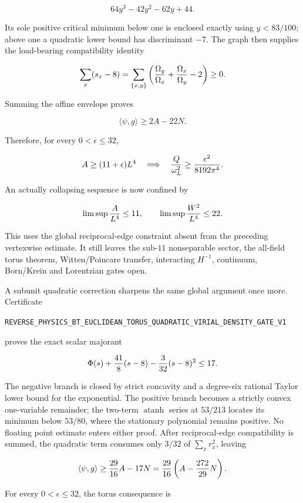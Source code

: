 \documentclass[11pt]{article}
\theoremstyle{definition}
\theoremstyle{remark}
\newcommand{\cert}[1]{\nolinkurl{#1}}
\begin{document}
\[
                         64y^3-42y^2-62y+44.
\]

Its sole positive critical minimum below one is enclosed exactly using
\(y<83/100\); above one a quadratic lower bound has discriminant \(-7\).
The graph then supplies the load-bearing compatibility identity

\[
 \sum_x(s_x-8)
 =\sum_{\{x,y\}}\left(
 {\Omega_y\over\Omega_x}+{\Omega_x\over\Omega_y}-2\right)\geq0.
\]

Summing the affine envelope proves

\[
                         \langle\psi,g\rangle\geq2A-22N.
\]

Therefore, for every \(0<\epsilon\leq32\),

\[
 A\geq(11+\epsilon)L^4
 \quad\Longrightarrow\quad
 {Q\over\omega_L^2}\geq{\epsilon^2\over8192\pi^4}.
\]

An actually collapsing sequence is now confined by

\[
 \limsup {A\over L^4}\leq11,
 \qquad
 \limsup {W^2\over L^4}\leq22.
\]

This uses the global reciprocal-edge constraint absent from the preceding
vertexwise estimate.  It still leaves the sub-\(11\) nonseparable sector,
the all-field torus theorem, Witten/Poincare transfer, interacting
\(H^{-1}\), continuum, Born/Krein and Lorentzian gates open.

A subunit quadratic correction sharpens the same global argument once more.
Certificate

\cert{REVERSE_PHYSICS_BT_EUCLIDEAN_TORUS_QUADRATIC_VIRIAL_DENSITY_GATE_V1}

proves the exact scalar majorant

\[
 \Phi(s)+{41\over8}(s-8)-{3\over32}(s-8)^2\leq17.
\]

The negative branch is closed by strict concavity and a degree-six rational
Taylor lower bound for the exponential.  The positive branch becomes a
strictly convex one-variable remainder; the two-term
\(\operatorname{atanh}\) series at \(53/213\) locates its minimum below
\(53/80\), where the stationary polynomial remains positive.  No floating
point estimate enters either proof.  After reciprocal-edge compatibility is
summed, the quadratic term consumes only \(3/32\) of
\(\sum_xr_x^2\), leaving

\[
 \langle\psi,g\rangle
 \geq {29\over16}A-17N
 ={29\over16}\left(A-{272\over29}N\right).
\]

For every \(0<\epsilon\leq32\), the torus consequence is
\end{document}
